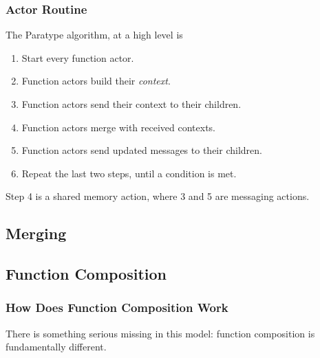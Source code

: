 \documentclass{beamer}
\begin{document}
\begin{frame}[fragile]
  \frametitle{Actor Routine}
  The Paratype algorithm, at a high level is
  \begin{multicols}{2}
    \begin{enumerate}
      \item Start every function actor.
      \item Function actors build their \emph{context}.
      \item Function actors send their context to their children.
      \item Function actors merge with received contexts.
      \item Function actors send updated messages to their children.
      \item Repeat the last two steps, until a condition is met.
    \end{enumerate}
  \end{multicols}

  Step 4 is a shared memory action, where 3 and 5 are messaging
  actions.
\end{frame}

\subsection{Merging}


\subsection{Function Composition}

\begin{frame}
  \frametitle{How Does Function Composition Work}
  
  There is something serious missing in this model: function
  composition is fundamentally different.
\end{frame}
\end{document}
